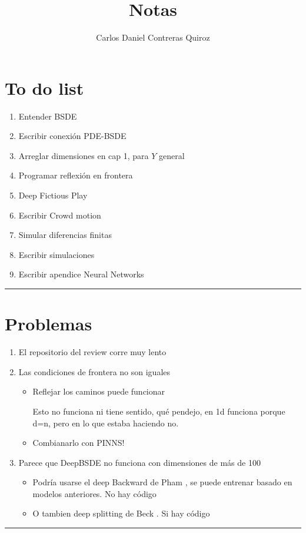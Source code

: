 \documentclass{article}
\title{Notas}
\author{Carlos Daniel Contreras Quiroz}
\newcommand{\HRule}{\rule{\linewidth}{0.5mm}}
\begin{document}
	\maketitle%
	\vspace{5mm}
	\section*{To do list}
	\begin{enumerate}
		\item Entender BSDE \greencheck
		\item Escribir conexión PDE-BSDE \greencheck
		\item Arreglar dimensiones en cap 1, para $Y$ general
		\item Programar reflexión en frontera \greencheck
		\item Deep Fictious Play
		\item Escribir Crowd motion
		\item Simular diferencias finitas
		\item Escribir simulaciones
		\item Escribir apendice Neural Networks
	\end{enumerate}
    \HRule\par
	\section*{Problemas}
	\begin{enumerate}
		\item El repositorio del review corre muy lento \bluecheck
		\item Las condiciones de frontera no son iguales
		\begin{itemize}
			\item Reflejar los caminos puede funcionar \redwrong 
			
			Esto no funciona ni tiene sentido, qué pendejo, en 1d funciona porque d=n, pero en lo que estaba haciendo no.
			\item Combianarlo con PINNS!
		\end{itemize}
		\item Parece que DeepBSDE no funciona con dimensiones de más de 100
		\begin{itemize}
			\item Podría usarse el deep Backward de Pham \cite{hure_deep_2020}, se puede entrenar basado en modelos anteriores. No hay código
			\item O tambien deep splitting de Beck \cite{beck_deep_2021}. Si hay código
		\end{itemize}
	\end{enumerate}
    \HRule\par
\end{document}
